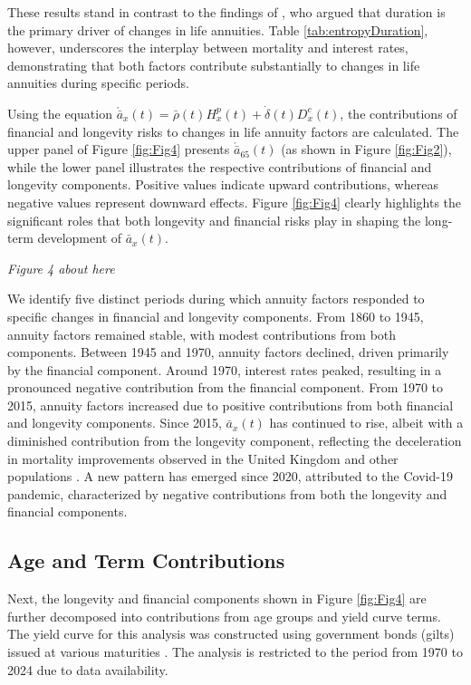 \documentclass[12pt]{article}
\begin{document}
These results stand in contrast to the findings of \citet{rabitti2020mortality}, who argued that duration is the primary driver of changes in life annuities. Table \ref{tab:entropyDuration}, however, underscores the interplay between mortality and interest rates, demonstrating that both factors contribute substantially to changes in life annuities during specific periods.

Using the equation \( \acute{\bar{a}}_x(t) = \bar{\rho}(t) {H}^{p}_x(t) + \dot{\delta}(t) D^{c}_x(t) \), the contributions of financial and longevity risks to changes in life annuity factors are calculated. The upper panel of Figure \ref{fig:Fig4} presents \( \acute{\bar{a}}_{65}(t) \) (as shown in Figure \ref{fig:Fig2}), while the lower panel illustrates the respective contributions of financial and longevity components. Positive values indicate upward contributions, whereas negative values represent downward effects. Figure \ref{fig:Fig4} clearly highlights the significant roles that both longevity and financial risks play in shaping the long-term development of \( \bar{a}_x(t) \).


\begin{center}
	\textit{Figure 4 about here}
\end{center}

We identify five distinct periods during which annuity factors responded to specific changes in financial and longevity components. From 1860 to 1945, annuity factors remained stable, with modest contributions from both components. Between 1945 and 1970, annuity factors declined, driven primarily by the financial component. Around 1970, interest rates peaked, resulting in a pronounced negative contribution from the financial component. From 1970 to 2015, annuity factors increased due to positive contributions from both financial and longevity components. Since 2015, \( \bar{a}_x(t) \) has continued to rise, albeit with a diminished contribution from the longevity component, reflecting the deceleration in mortality improvements observed in the United Kingdom and other populations \citep{djeundje2022slowdown}. A new pattern has emerged since 2020, attributed to the Covid-19 pandemic, characterized by negative contributions from both the longevity and financial components.


\subsection{Age and Term Contributions}

Next, the longevity and financial components shown in Figure \ref{fig:Fig4} are further decomposed into contributions from age groups and yield curve terms. The yield curve for this analysis was constructed using government bonds (gilts) issued at various maturities \citep{BankOfEngland2024}. The analysis is restricted to the period from 1970 to 2024 due to data availability.
\end{document}
